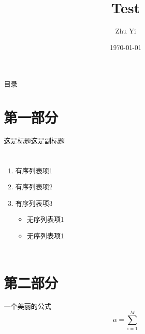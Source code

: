 \documentclass[UTF-8]{beamer}
\begin{document}
    
    \title{Test}
    \author{Zhu Yi}
    \date{\today}
    
    \begin{frame}[plain]
        \titlepage
    \end{frame}
    
    \begin{frame}[plain]{目录}
        \tableofcontents
    \end{frame}
    
    \section{第一部分}
        \begin{frame}{这是标题}{这是副标题}
            \begin{columns}[onlytextwidth]
                 \begin{enumerate}
                     \item 有序列表项1
                     \item 有序列表项2
                     \item 有序列表项3
                         \begin{itemize}
                             \item 无序列表项1
                             \item 无序列表项1
                         \end{itemize}
                 \end{enumerate}
             \end{columns}
        \end{frame}
    
    \section{第二部分}  
        \begin{frame}{一个美丽的公式}
            $$\alpha = \sum_{i=1}^M$$
        \end{frame}
    
\end{document}
